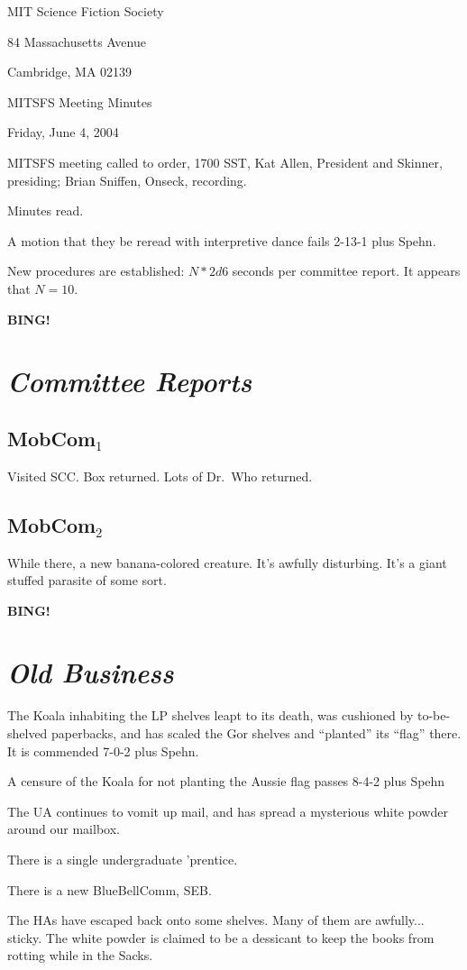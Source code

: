 \documentclass[10pt]{article}
\newcommand{\bing}{{\bf BING!} }
\newcommand{\goto}[1]{\bing \vskip 12pt \section*{{\em{#1}}}}
\newcommand{\ps}{ plus Spehn\xspace}
\begin{document}
\begin{center}

MIT Science Fiction Society 

84 Massachusetts Avenue

Cambridge, MA 02139

\vspace{12pt}

MITSFS Meeting Minutes 

Friday, June 4, 2004

\end{center}
 
\vspace{18pt}

\setlength{\parskip}{6pt}

\noindent
MITSFS meeting called to order, 1700 SST, Kat Allen, President and
Skinner, presiding; Brian Sniffen,  Onseck, recording.

Minutes read.

A motion that they be reread with interpretive dance fails 2-13-1\ps.

New procedures are established: $N * 2d6$ seconds per committee report.
It appears that $N=10$.

\goto{Committee Reports}
\subsection*{MobCom$_1$}
Visited SCC.  Box returned.  Lots of Dr.\ Who returned.
\subsection*{MobCom$_2$}
While there, a new banana-colored creature.  It's awfully disturbing.
It's a giant stuffed parasite of some sort.  


\goto{Old Business}

The Koala inhabiting the LP shelves leapt to its death, was cushioned
by to-be-shelved paperbacks, and has scaled the Gor shelves and
``planted'' its ``flag'' there.  It is commended 7-0-2\ps.

A censure of the Koala for not planting the Aussie flag passes 8-4-2\ps

The UA continues to vomit up mail, and has spread a mysterious white
powder around our mailbox.

There is a single undergraduate 'prentice.

There is a new BlueBellComm, SEB.

The HAs have escaped back onto some shelves.  Many of them are
awfully... sticky.  The white powder is claimed to be a dessicant to
keep the books from rotting while in the Sacks.
\end{document}
